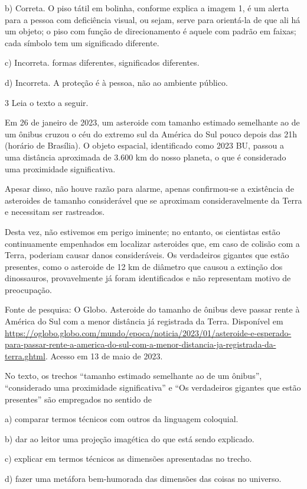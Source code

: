 b) Correta. O piso tátil em bolinha, conforme explica a imagem 1, é um
alerta para a pessoa com deficiência visual, ou sejam, serve para
orientá-la de que ali há um objeto; o piso com função de direcionamento
é aquele com padrão em faixas; cada símbolo tem um significado
diferente.

c) Incorreta. formas diferentes, significados diferentes.

d) Incorreta. A proteção é à pessoa, não ao ambiente público.

\num{3} Leia o texto a seguir.

Em 26 de janeiro de 2023, um asteroide com tamanho estimado semelhante
ao de um ônibus cruzou o céu do extremo sul da América do Sul pouco
depois das 21h (horário de Brasília). O objeto espacial, identificado
como 2023 BU, passou a uma distância aproximada de 3.600 km do nosso
planeta, o que é considerado uma proximidade significativa.

Apesar disso, não houve razão para alarme, apenas confirmou-se a
existência de asteroides de tamanho considerável que se aproximam
consideravelmente da Terra e necessitam ser rastreados.

Desta vez, não estivemos em perigo iminente; no entanto, os cientistas
estão continuamente empenhados em localizar asteroides que, em caso de
colisão com a Terra, poderiam causar danos consideráveis. Os verdadeiros
gigantes que estão presentes, como o asteroide de 12 km de diâmetro que
causou a extinção dos dinossauros, provavelmente já foram identificados
e não representam motivo de preocupação.

Fonte de pesquisa: O Globo. Asteroide do tamanho de ônibus deve passar
rente à América do Sul com a menor distância já registrada da Terra.
Disponível em
\url{https://oglobo.globo.com/mundo/epoca/noticia/2023/01/asteroide-e-esperado-para-passar-rente-a-america-do-sul-com-a-menor-distancia-ja-registrada-da-terra.ghtml}.
Acesso em 13 de maio de 2023.

No texto, os trechos ``tamanho estimado semelhante ao de um ônibus'',
``considerado uma proximidade significativa'' e ``Os verdadeiros
gigantes que estão presentes'' são empregados no sentido de

a) comparar termos técnicos com outros da linguagem coloquial.

b) dar ao leitor uma projeção imagética do que está sendo explicado.

c) explicar em termos técnicos as dimensões apresentadas no trecho.

d) fazer uma metáfora bem-humorada das dimensões das coisas no universo.

